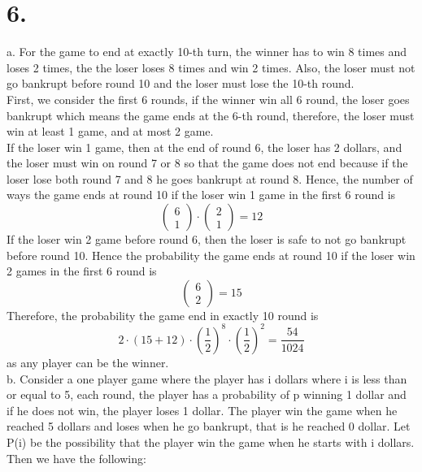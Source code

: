 \documentclass[11pt]{article}
\begin{document}
\section*{6.}
a. For the game to end at exactly 10-th turn, the winner has to win 8 times and loses 2 times, the the loser loses 8 times and win 2 times. Also, the loser must not go bankrupt before round 10 and the loser must lose the 10-th round. \\
First, we consider the first 6 rounds, if the winner win all 6 round, the loser goes bankrupt which means the game ends at the 6-th round, therefore, the loser must win at least 1 game, and at most 2 game. \\
If the loser win 1 game, then at the end of round 6, the loser has 2 dollars, and the loser must win on round 7 or 8 so that the game does not end because if the loser lose both round 7 and 8 he goes bankrupt at round 8. Hence, the number of ways the game ends at round 10 if the loser win 1 game in the first 6 round is 
\[
\begin{pmatrix}
6 \\ 
1
\end{pmatrix}
\cdot 
\begin{pmatrix}
2 \\ 
1
\end{pmatrix} = 12
\]
If the loser win 2 game before round 6, then the loser is safe to not go bankrupt before round 10. Hence the probability the game ends at round 10 if the loser win 2 games in the first 6 round is 
\[
\begin{pmatrix}
6 \\ 
2
\end{pmatrix}
= 15
\]
Therefore, the probability the game end in exactly 10 round is 
\[
2 \cdot
(15+12)
\cdot 
\left( \frac{1}{2} \right)^8
\cdot
\left( \frac{1}{2} \right)^2
= \frac{54}{1024}
\]
as any player can be the winner. \\
b. Consider a one player game where the player has i dollars where i is less than or equal to 5, each round, the player has a probability of p winning 1 dollar and if he does not win, the player loses 1 dollar. The player win the game when he reached 5 dollars and loses when he go bankrupt, that is he reached 0 dollar.
Let P(i) be the possibility that the player win the game when he starts with i dollars. \\
Then we have the following: 
\end{document}
